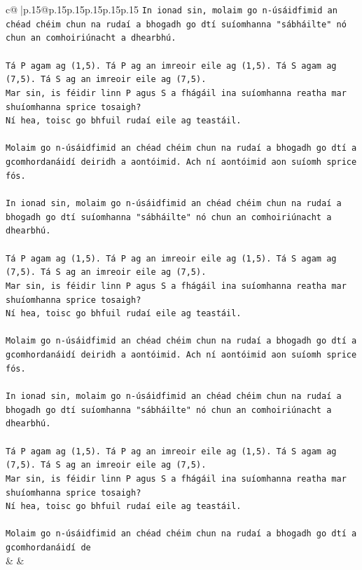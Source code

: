 \documentclass{article}
\begin{document}
{\begin{supertabular}{c@{$\;$}|p{.15\linewidth}@{}p{.15\linewidth}p{.15\linewidth}p{.15\linewidth}p{.15\linewidth}p{.15\linewidth}}
{{{\texttt{In ionad sin, molaim go n{-}úsáidfimid an chéad chéim chun na rudaí a bhogadh go dtí suíomhanna "sábháilte" nó chun an comhoiriúnacht a dhearbhú.} \\
\\ 
\texttt{Tá P agam ag (1,5). Tá P ag an imreoir eile ag (1,5). Tá S agam ag (7,5). Tá S ag an imreoir eile ag (7,5).} \\
\texttt{Mar sin, is féidir linn P agus S a fhágáil ina suíomhanna reatha mar shuíomhanna sprice tosaigh?} \\
\texttt{Ní hea, toisc go bhfuil rudaí eile ag teastáil.} \\
\\ 
\texttt{Molaim go n{-}úsáidfimid an chéad chéim chun na rudaí a bhogadh go dtí a gcomhordanáidí deiridh a aontóimid. Ach ní aontóimid aon suíomh sprice fós.} \\
\\ 
\texttt{In ionad sin, molaim go n{-}úsáidfimid an chéad chéim chun na rudaí a bhogadh go dtí suíomhanna "sábháilte" nó chun an comhoiriúnacht a dhearbhú.} \\
\\ 
\texttt{Tá P agam ag (1,5). Tá P ag an imreoir eile ag (1,5). Tá S agam ag (7,5). Tá S ag an imreoir eile ag (7,5).} \\
\texttt{Mar sin, is féidir linn P agus S a fhágáil ina suíomhanna reatha mar shuíomhanna sprice tosaigh?} \\
\texttt{Ní hea, toisc go bhfuil rudaí eile ag teastáil.} \\
\\ 
\texttt{Molaim go n{-}úsáidfimid an chéad chéim chun na rudaí a bhogadh go dtí a gcomhordanáidí deiridh a aontóimid. Ach ní aontóimid aon suíomh sprice fós.} \\
\\ 
\texttt{In ionad sin, molaim go n{-}úsáidfimid an chéad chéim chun na rudaí a bhogadh go dtí suíomhanna "sábháilte" nó chun an comhoiriúnacht a dhearbhú.} \\
\\ 
\texttt{Tá P agam ag (1,5). Tá P ag an imreoir eile ag (1,5). Tá S agam ag (7,5). Tá S ag an imreoir eile ag (7,5).} \\
\texttt{Mar sin, is féidir linn P agus S a fhágáil ina suíomhanna reatha mar shuíomhanna sprice tosaigh?} \\
\texttt{Ní hea, toisc go bhfuil rudaí eile ag teastáil.} \\
\\ 
\texttt{Molaim go n{-}úsáidfimid an chéad chéim chun na rudaí a bhogadh go dtí a gcomhordanáidí de} \\
            }
        }
    }
    & & \\ \\


\end{supertabular}}
\end{document}
